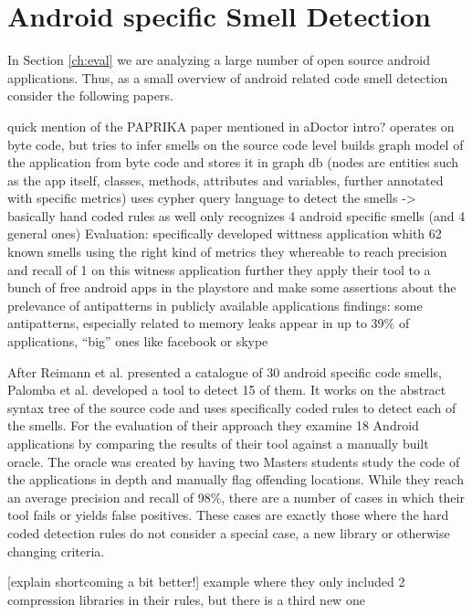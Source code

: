 \section{Android specific Smell Detection}

In Section \ref{ch:eval} we are analyzing a large number of open source android applications.
Thus, as a small overview of android related code smell detection consider the following papers.

quick mention of the PAPRIKA paper mentioned in aDoctor intro? \cite{hecht2015detecting}
    operates on byte code, but tries to infer smells on the source code level
    builds graph model of the application from byte code and stores it in graph db (nodes are entities such as the app itself, classes, methods, attributes and variables, further annotated with specific metrics)
    uses cypher query language to detect the smells -> basically hand coded rules as well
    only recognizes 4 android specific smells (and 4 general ones)
    Evaluation: specifically developed wittness application whith 62 known smells
    using the right kind of metrics they whereable to reach precision and recall of 1 on this witness application
    further they apply their tool to a bunch of free android apps in the playstore and make some assertions about the prelevance of antipatterns in publicly available applications
    findings: some antipatterns, especially related to memory leaks appear in up to 39\% of applications, ``big'' ones like facebook or skype

After Reimann et al. \cite{reimann2014tool} presented a catalogue of 30 android specific code smells, Palomba et al. \cite{palomba2017lightweight} developed a tool to detect 15 of them.
It works on the abstract syntax tree of the source code and uses specifically coded rules to detect each of the smells.
For the evaluation of their approach they examine 18 Android applications by comparing the results of their tool against a manually built oracle.
The oracle was created by having two Masters students study the code of the applications in depth and manually flag offending locations.
While they reach an average precision and recall of 98\%, there are a number of cases in which their tool fails or yields false positives.
These cases are exactly those where the hard coded detection rules do not consider a special case, a new library or otherwise changing criteria.

[explain shortcoming a bit better!]
example where they only included 2 compression libraries in their rules, but there is a third new one

